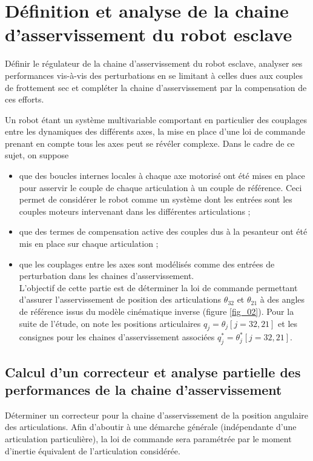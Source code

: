 
\section{Définition et analyse de la chaine d'asservissement du robot esclave}
\begin{obj}
Définir le régulateur de la chaine d'asservissement du robot esclave, analyser ses performances vis-à-vis des perturbations en se limitant à celles dues aux couples de frottement sec et compléter la chaine d'asservissement par la compensation de ces efforts.
\end{obj}

Un robot étant un système multivariable comportant en particulier des couplages entre les dynamiques des différents axes, la mise en place d'une loi de commande prenant en compte tous les axes peut se révéler complexe. Dans le cadre de ce sujet, on suppose

\begin{itemize}
  \item que des boucles internes locales à chaque axe motorisé ont été mises en place pour asservir le couple de chaque articulation à un couple de référence. Ceci permet de considérer le robot comme un système dont les entrées sont les couples moteurs intervenant dans les différentes articulations ;
  \item que des termes de compensation active des couples dus à la pesanteur ont été mis en place sur chaque articulation ;
  \item que les couplages entre les axes sont modélisés comme des entrées de perturbation dans les chaines d'asservissement.\\
L'objectif de cette partie est de déterminer la loi de commande permettant d'assurer l'asservissement de position des articulations $\theta_{32}$ et $\theta_{21}$ à des angles de référence issus du modèle cinématique inverse (figure \ref{fig_02}). Pour la suite de l'étude, on note les positions articulaires $q_{j}=\theta_{j}[j=32,21]$ et les consignes pour les chaines d'asservissement associées $q_{j}^{*}=\theta_{j}^{*}[j=32,21]$.
\end{itemize}

\subsection{Calcul d'un correcteur et analyse partielle des performances de la chaine d'asservissement}
\begin{obj}
Déterminer un correcteur pour la chaine d'asservissement de la position angulaire des articulations. Afin d'aboutir à une démarche générale (indépendante d'une articulation particulière), la loi de commande sera paramétrée par le moment d'inertie équivalent de l'articulation considérée.
\end{obj}

